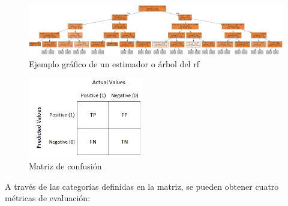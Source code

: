 \begin{figure}
  \centering
  \includegraphics[width=1\textwidth]{img/desarrollo/rf/tree2.png}
  \caption{Ejemplo gráfico de un estimador o árbol del \acrshort{rf} \cite{graphviz}}
  \label{fig:tree}
\end{figure}

\begin{figure}[H]
  \centering
  \includegraphics[width=0.45\textwidth]{img/desarrollo/rf/confusion.png}
  \caption{Matriz de confusión \cite{cm2}}
  \label{fig:confusion}
\end{figure}

\vspace{3mm}

A través de las categorías definidas en la matriz, se pueden obtener cuatro métricas de evaluación: 

\vspace{3mm}

